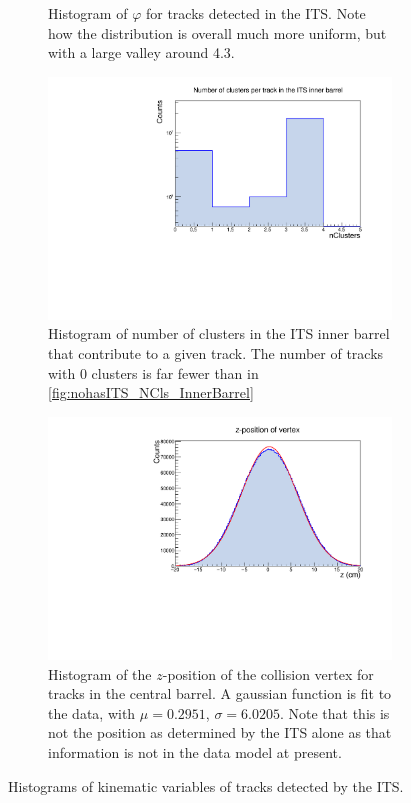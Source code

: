 \begin{figure}[h]
\begin{subfigure}[t]{.49\linewidth}
        \caption{Histogram of $\varphi$ for tracks detected in the ITS. Note how the distribution is overall much more uniform, but with a large valley around 4.3.}
        \label{fig:ITS_phi}
    \end{subfigure}
    \begin{subfigure}[t]{.49\linewidth}
        \centering
        \includegraphics[width=\linewidth]{Plots/pass4_TracksIU/itsNClsInnerBarrel.pdf}
        \caption{Histogram of number of clusters in the ITS inner barrel that contribute to a given track. The number of tracks with 0 clusters is far fewer than in \cref{fig:nohasITS_NCls_InnerBarrel}}
        \label{fig:ITS_NCls_InnerBarrel}
    \end{subfigure}
    \hfill
    \begin{subfigure}[t]{.49\linewidth}
        \centering
        \includegraphics[width=\linewidth]{Plots/pass4_TracksIU/Z.pdf}
        \caption{Histogram of the $z$-position of the collision vertex for tracks in the central barrel. A gaussian function is fit to the data, with $\mu=0.2951$, $\sigma=6.0205$. Note that this is not the position as determined by the ITS alone as that information is not in the data model at present.}
        \label{fig:ITS_Z}
    \end{subfigure}
\caption{Histograms of kinematic variables of tracks detected by the ITS. }
\label{fig:ITS_1D}
\end{figure}

